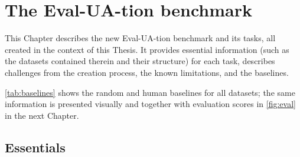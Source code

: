 \chapter{The Eval-UA-tion benchmark}\label{eval-ua-tion-ukrainian-eval-benchmark}
This Chapter describes the new Eval-UA-tion benchmark and its tasks, all created in the context of this Thesis. 
It provides essential information (such as the datasets contained therein and their structure) for each task, 
describes challenges from the creation process, 
the known limitations, and the baselines.

\autoref{tab:baselines} shows the random and human baselines for all datasets;
the same information is presented visually and together with evaluation scores in \autoref{fig:eval} in the next Chapter.


\section{Essentials}\label{basic-description}\label{sec:essentials-eval-ua-tion-datasets}

